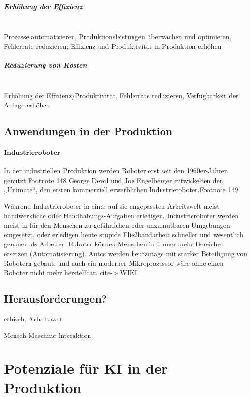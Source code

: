 \documentclass[a4paper,12pt, german]{report}
\begin{document}
\paragraph{Erhöhung der Effizienz} $ $ \\ 
Prozesse automatisieren, Produktionsleistungen überwachen und optimieren, Fehlerrate reduzieren, Effizienz und Produktivität in Produktion erhöhen

\paragraph{Reduzierung von Kosten} $ $ \\ 
Erhöhung der Effizienz/Produktivität, Fehlerrate reduzieren, Verfügbarkeit der Anlage erhöhen


\section{Anwendungen in der Produktion}
\subsubsection{Industrieroboter}
In der industriellen Produktion werden Roboter erst seit den 1960er-Jahren genutzt.Footnote 148 George Devol und Joe Engelberger entwickelten den „Unimate“, den ersten kommerziell erwerblichen Industrieroboter.Footnote 149 \cite{19}

Während Industrieroboter in einer auf sie angepassten Arbeitswelt meist handwerkliche oder Handhabungs-Aufgaben erledigen. Industrieroboter werden meist in für den Menschen zu gefährlichen oder unzumutbaren Umgebungen eingesetzt, oder erledigen heute stupide Fließbandarbeit schneller und wesentlich genauer als Arbeiter. Roboter können Menschen in immer mehr Bereichen ersetzen (Automatisierung). Autos werden heutzutage mit starker Beteiligung von Robotern gebaut, und auch ein moderner Mikroprozessor wäre ohne einen Roboter nicht mehr herstellbar. cite-> WIKI


\section{Herausforderungen?}
ethisch, Arbeitswelt

Mensch-Maschine Interaktion

\chapter{Potenziale für KI in der Produktion}
\end{document}
